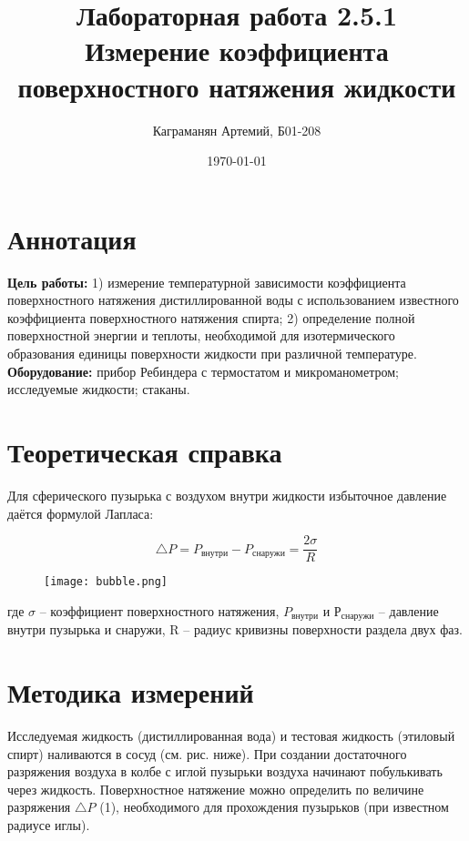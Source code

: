 \documentclass[a4paper, 12pt]{article}
\author{Каграманян Артемий, Б01-208}
\date{\today}
\title{Лабораторная работа 2.5.1 \\ Измерение коэффициента поверхностного натяжения жидкости }
\begin{document}
\maketitle

\section{Аннотация}
    \textbf{Цель работы:} 1) измерение температурной зависимости  коэффициента поверхностного натяжения дистиллированной воды с использованием известного коэффициента поверхностного натяжения спирта;  2) определение полной поверхностной энергии  и теплоты, необходимой для изотермического образования единицы  поверхности жидкости  при различной температуре.  \\
    
    \textbf{Оборудование:} прибор Ребиндера с термостатом и микроманометром; исследуемые жидкости; стаканы.


\section {Теоретическая справка} 

    Для сферического пузырька с воздухом  внутри жидкости избыточное давление даётся формулой Лапласа:

    \begin{equation}
        \triangle P = P_{внутри} - P_{снаружи} = \dfrac{2\sigma}{R}         
    \end{equation}
    
    \begin{figure}[h]
        \centering
        \texttt{[image: bubble.png]}
    \end{figure}

    где $\sigma$ – коэффициент поверхностного натяжения, $P_{внутри}$ и $Р_{снаружи}$ – давление внутри пузырька и снаружи, R – радиус кривизны поверхности раздела двух фаз.

\section {Методика измерений}

    Исследуемая жидкость (дистиллированная вода) и тестовая жидкость (этиловый спирт) наливаются в сосуд (см. рис. ниже). При создании достаточного  разряжения воздуха в колбе с иглой пузырьки воздуха начинают побулькивать через жидкость. Поверхностное натяжение можно определить по величине разряжения $\triangle P$ (1), необходимого для прохождения пузырьков (при известном радиусе иглы).
    
\end{document}
